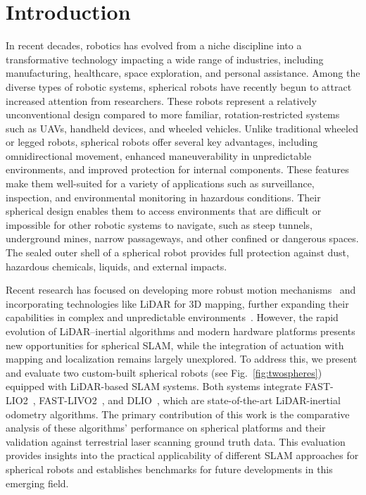 \documentclass[english, bachelor, utf8]{base/thesis_telematics}
\begin{document}
\chapter{Introduction}
\label{ch:introduction}

In recent decades, robotics has evolved from a niche discipline into a transformative technology impacting a wide range of industries, including manufacturing, healthcare, space exploration, and personal assistance. 
Among the diverse types of robotic systems, spherical robots have recently begun to attract increased attention from researchers. These robots represent a relatively unconventional design compared to more familiar, rotation-restricted systems such as UAVs, handheld devices, and wheeled vehicles. 
Unlike traditional wheeled or legged robots, spherical robots offer several key advantages, including omnidirectional movement, enhanced maneuverability in unpredictable environments, and improved protection for internal components. 
These features make them well-suited for a variety of applications such as surveillance, inspection, and environmental monitoring in hazardous conditions. 
Their spherical design enables them to access environments that are difficult or impossible for other robotic systems to navigate, such as steep tunnels, underground mines, narrow passageways, and other confined or dangerous spaces.
The sealed outer shell of a spherical robot provides full protection against dust, hazardous chemicals, liquids, and external impacts. 

Recent research has focused on developing more robust motion mechanisms~\cite{roboball,novelsphere,pendulum_sphere} and incorporating technologies like LiDAR for 3D mapping, further expanding their capabilities in complex and unpredictable environments~\cite{Kalman_filter_sphere,DAEDALUS,sphere_Fabi_1}.
However, the rapid evolution of LiDAR–inertial algorithms and modern hardware platforms presents new opportunities for spherical SLAM, while the integration of actuation with mapping and localization remains largely unexplored.
To address this, we present and evaluate two custom-built spherical robots (see Fig.~\ref{fig:twospheres}) equipped with LiDAR-based SLAM systems.
Both systems integrate FAST-LIO2~\cite{fastlio2}, FAST-LIVO2~\cite{fastlivo2}, and DLIO~\cite{dlio}, which are state-of-the-art LiDAR-inertial odometry algorithms.
The primary contribution of this work is the comparative analysis of these algorithms' performance on spherical platforms and their validation against terrestrial laser scanning ground truth data.
This evaluation provides insights into the practical applicability of different SLAM approaches for spherical robots and establishes benchmarks for future developments in this emerging field.
\end{document}
